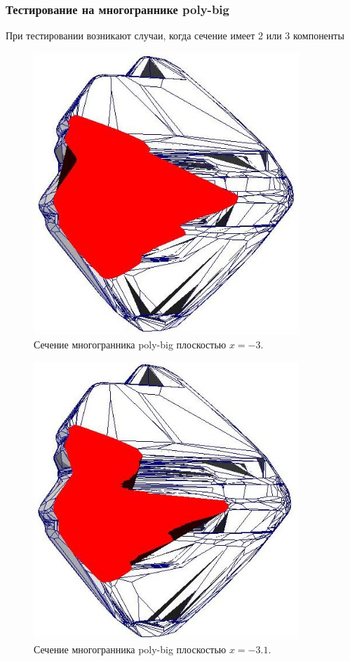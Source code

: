 \documentclass[a4paper,12pt, titlepage]{article}
\begin{document}
\subsubsection{Тестирование на многограннике poly-big}
	\begin{flushleft}
		При тестировании возникают случаи, когда сечение имеет 2 или 3 компоненты
	\end{flushleft}
	\begin{flushleft}
		\begin{figure}[ht]
		    \includegraphics[width=10cm]{poly-big/intersect0.jpeg}
		    \caption{Сечение многогранника poly-big плоскостью $x = -3$.}
		    \label{poly-big-1}
		\end{figure}
	\end{flushleft}
	\begin{flushleft}
		\begin{figure}[p]
		    \includegraphics[width=10cm]{poly-big/intersect1.jpeg}
		    \caption{Сечение многогранника poly-big плоскостью $x = -3.1$.}
		    \label{poly-big-2}
		\end{figure}
	\end{flushleft}
\end{document}
